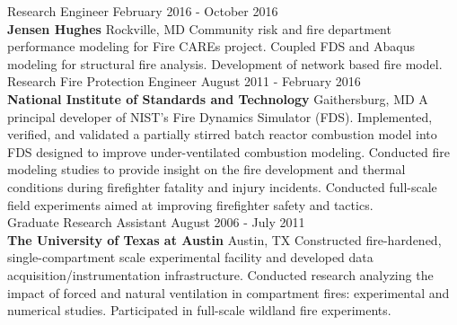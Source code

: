 \documentclass[10pt,letterpaper]{article}
\begin{document}
Research Engineer \hfill February 2016 - October 2016 \\
{\bf Jensen Hughes} \hfill Rockville, MD \vskip3pt
Community risk and fire department performance modeling for Fire CAREs project. Coupled FDS and Abaqus modeling for structural fire analysis. Development of network based fire model.\\

Research Fire Protection Engineer \hfill August 2011 - February 2016 \\
{\bf National Institute of Standards and Technology} \hfill Gaithersburg, MD \vskip3pt
A principal developer of NIST's Fire Dynamics Simulator (FDS). Implemented, verified, and validated a partially stirred batch reactor combustion model into FDS designed to improve under-ventilated combustion modeling. Conducted fire modeling studies to provide insight on the fire development and thermal conditions during firefighter fatality and injury incidents. Conducted full-scale field experiments aimed at improving firefighter safety and tactics. \\

Graduate Research Assistant \hfill August 2006 - July 2011 \\
{\bf The University of Texas at Austin} \hfill Austin, TX \vskip3pt
Constructed fire-hardened, single-compartment scale experimental facility and developed data acquisition/instrumentation infrastructure. Conducted research analyzing the impact of forced and natural ventilation in compartment fires: experimental and numerical studies. Participated in full-scale wildland fire experiments. \\


\end{document}
